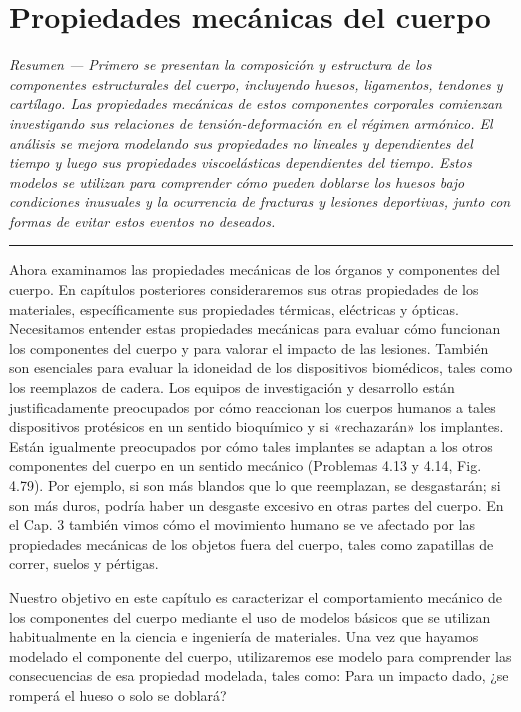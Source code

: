 \documentclass[12pt]{book}
\begin{document}
\setcounter{chapter}{3}

\chapter{Propiedades mecánicas del cuerpo}

\begin{flushleft}
    \textit{Resumen --- Primero se presentan la composición y estructura de los componentes estructurales del cuerpo, incluyendo huesos, ligamentos, tendones y cartílago. Las propiedades mecánicas de estos componentes corporales comienzan investigando sus relaciones de tensión-deformación en el régimen armónico. El análisis se mejora modelando sus propiedades no lineales y dependientes del tiempo y luego sus propiedades viscoelásticas dependientes del tiempo. Estos modelos se utilizan para comprender cómo pueden doblarse los huesos bajo condiciones inusuales y la ocurrencia de fracturas y lesiones deportivas, junto con formas de evitar estos eventos no deseados.}
\end{flushleft}

\hrule
\vspace{1em}

Ahora examinamos las propiedades mecánicas de los órganos y componentes del cuerpo. En capítulos posteriores consideraremos sus otras propiedades de los materiales, específicamente sus propiedades térmicas, eléctricas y ópticas. Necesitamos entender estas propiedades mecánicas para evaluar cómo funcionan los componentes del cuerpo y para valorar el impacto de las lesiones. También son esenciales para evaluar la idoneidad de los dispositivos biomédicos, tales como los reemplazos de cadera. Los equipos de investigación y desarrollo están justificadamente preocupados por cómo reaccionan los cuerpos humanos a tales dispositivos protésicos en un sentido bioquímico y si «rechazarán» los implantes. Están igualmente preocupados por cómo tales implantes se adaptan a los otros componentes del cuerpo en un sentido mecánico \cite{8} (Problemas 4.13 y 4.14, Fig. 4.79). Por ejemplo, si son más blandos que lo que reemplazan, se desgastarán; si son más duros, podría haber un desgaste excesivo en otras partes del cuerpo. En el Cap. 3 también vimos cómo el movimiento humano se ve afectado por las propiedades mecánicas de los objetos fuera del cuerpo, tales como zapatillas de correr, suelos y pértigas.

Nuestro objetivo en este capítulo es caracterizar el comportamiento mecánico de los componentes del cuerpo mediante el uso de modelos básicos que se utilizan habitualmente en la ciencia e ingeniería de materiales. Una vez que hayamos modelado el componente del cuerpo, utilizaremos ese modelo para comprender las consecuencias de esa propiedad modelada, tales como: Para un impacto dado, ¿se romperá el hueso o solo se doblará?
\end{document}
